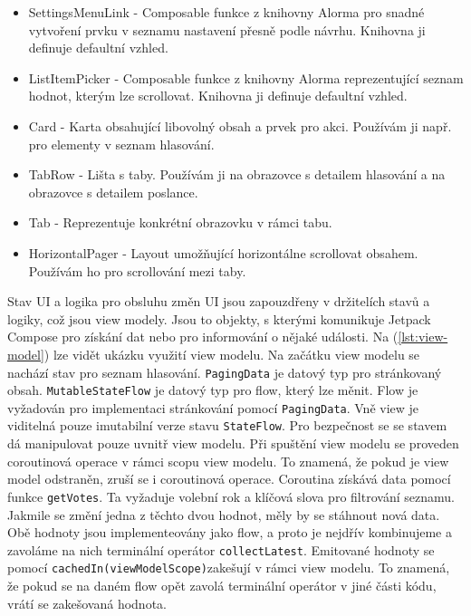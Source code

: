 \begin{itemize}
	\item SettingsMenuLink - Composable funkce z knihovny Alorma pro snadné vytvoření prvku v seznamu nastavení přesně podle návrhu. Knihovna ji definuje defaultní vzhled.
	\item ListItemPicker - Composable funkce z knihovny Alorma reprezentující seznam hodnot, kterým lze scrollovat. Knihovna ji definuje defaultní vzhled.
	\item Card - Karta obsahující libovolný obsah a prvek pro akci. Používám ji např. pro elementy v seznam hlasování.
	\item TabRow - Lišta s taby. Používám ji na obrazovce s detailem hlasování a na obrazovce s detailem poslance.
	\item Tab - Reprezentuje konkrétní obrazovku v rámci tabu.
	\item HorizontalPager - Layout umožňující horizontálne scrollovat obsahem. Používám ho pro scrollování mezi taby.
\end{itemize}

\vspace{10px}

\noindent Stav UI a logika pro obsluhu změn UI jsou zapouzdřeny v držitelích stavů a logiky, což jsou view modely. Jsou to objekty, s kterými komunikuje Jetpack Compose pro získání dat nebo pro informování o nějaké události. Na (\ref{lst:view-model}) lze vidět ukázku využití view modelu. Na začátku view modelu se nachází stav pro seznam hlasování. \lstinline|PagingData| je datový typ pro stránkovaný obsah. \lstinline|MutableStateFlow| je datový typ pro flow, který lze měnit. Flow je vyžadován pro implementaci stránkování pomocí \lstinline|PagingData|. Vně view je viditelná pouze imutabilní verze stavu \lstinline|StateFlow|. Pro bezpečnost se se stavem dá manipulovat pouze uvnitř view modelu. Při spuštění view modelu se proveden coroutinová operace v rámci scopu view modelu. To znamená, že pokud je view model odstraněn, zruší se i coroutinová operace. Coroutina získává data pomocí funkce \lstinline|getVotes|. Ta vyžaduje volební rok a klíčová slova pro filtrování seznamu. Jakmile se změní jedna z těchto dvou hodnot, měly by se stáhnout nová data. Obě hodnoty jsou implementeovány jako flow, a proto je nejdřív kombinujeme a zavoláme na nich terminální operátor \lstinline|collectLatest|. Emitované hodnoty se pomocí \lstinline|cachedIn(viewModelScope)|zakešují v rámci view modelu. To znamená, že pokud se na daném flow opět zavolá terminální operátor v jiné části kódu, vrátí se zakešovaná hodnota. 

